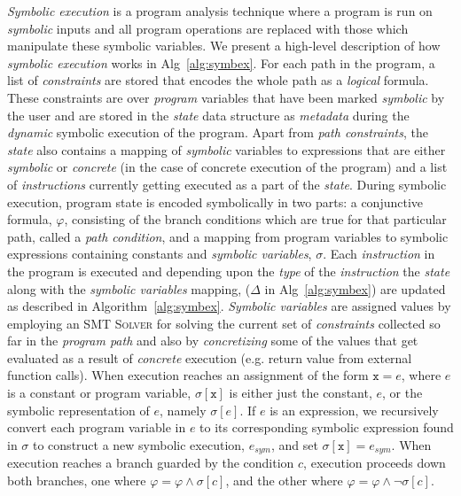 \documentclass[acmsmall,review]{acmart}\settopmatter{}
\begin{document}
	\textit{Symbolic execution} is a program analysis technique where a program is run on \textit{symbolic} inputs and all program operations are replaced with those which manipulate these symbolic variables.
	We present a high-level description of how \textit{symbolic execution} works in Alg~\ref{alg:symbex}. 
	For each path in the program, a list of \textit{constraints} are stored that encodes the whole path as a \textit{logical}
	formula.
	These constraints are over \textit{program} variables that have been marked \textit{symbolic} by the user and are stored in the \textit{state} data structure as \textit{metadata} during the \textit{dynamic} symbolic execution of the program.
	Apart from \textit{path constraints}, the \textit{state} also contains a mapping of \textit{symbolic} variables to expressions that are either  \textit{symbolic} or \textit{concrete} (in the case of concrete execution of the program) and a list of \textit{instructions} currently getting executed as a part of the \textit{state}.	
	During symbolic execution, program state is encoded symbolically in two parts: a conjunctive formula, $\varphi$, consisting of the branch conditions which are true for that particular path, called a \textit{path condition}, and a mapping from program variables to symbolic expressions containing constants and \textit{symbolic variables}, $\sigma$.
	Each \textit{instruction} in the program is executed and depending upon the \textit{type} of the \textit{instruction} the \textit{state} along with the \textit{symbolic variables} mapping, ($\Delta$ in Alg~\ref{alg:symbex}) are updated as described in Algorithm~\ref{alg:symbex}.
	\textit{Symbolic variables} are assigned values by employing an \textsc{SMT Solver} for solving the current set of \textit{constraints} collected so far in the \textit{program path} and also by \textit{concretizing} some of the values that get evaluated as a result of \textit{concrete} execution (e.g. return value from external function calls).
	When execution reaches an assignment of the form $\mathtt{x} = e$, where $e$ is a constant or program variable, $\sigma[\mathtt{x}]$ is either just the constant, $e$, or the symbolic representation of $e$, namely $\sigma[e]$.
	If $e$ is an expression, we recursively convert each program variable in $e$ to its corresponding symbolic expression found in $\sigma$ to construct a new symbolic execution, $e_{sym}$, and set $\sigma[\mathtt{x}] = e_{sym}$.
	When execution reaches a branch guarded by the condition $c$, execution proceeds down both branches, one where $\varphi = \varphi \wedge \sigma[c]$, and the other where $\varphi = \varphi \wedge \neg \sigma[c]$. 
	
\end{document}
